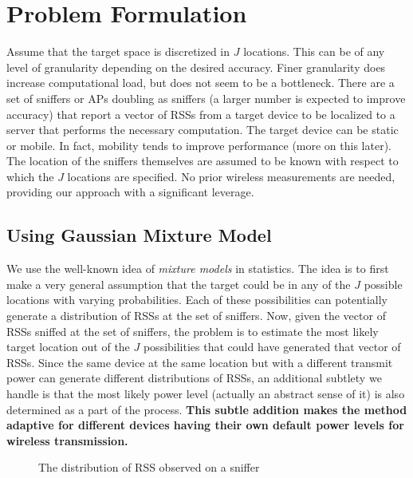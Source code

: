
\section{Problem Formulation}
\label{sec:problemformulation}

Assume that the target space is discretized in $J$ locations. 
This can be of any level of granularity 
depending on the desired accuracy. Finer granularity does increase computational load, but does not seem to be a bottleneck. There are a set of sniffers or APs doubling as sniffers (a larger number is expected to improve accuracy) that report a vector of RSSs from a target device to be localized to a server that performs the necessary computation. The target device can be static or mobile. In fact, mobility tends to improve performance (more on this later). The location of the sniffers themselves are assumed to be known with respect to which the $J$ locations
are specified. No prior wireless measurements are needed, providing our approach with a significant leverage. 

\subsection{Using Gaussian Mixture Model}
We use the well-known idea of {\em mixture models} in statistics. The idea is to first make a very general assumption that the target could be in any of the $J$ possible locations with varying probabilities. Each of these possibilities can potentially generate a distribution of RSSs
at the set of sniffers. Now, given the vector of RSSs sniffed at the set of sniffers, the problem is to estimate the most likely target 
location out of the $J$ possibilities that could have generated that vector of RSSs. Since 
the same device at the same location but with a different transmit power can generate different distributions of RSSs, an additional subtlety we handle is that the
most likely power level (actually an abstract sense of it) is also
determined as a part of the process. {\bf This subtle addition makes the
method adaptive for different devices having their own default power
levels for wireless transmission. }

\begin{figure} 
\centering
{} 
\caption{The distribution of RSS observed on a sniffer}
\label{fig:distribution}
\end{figure}

